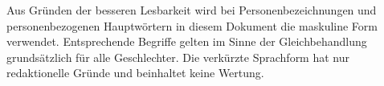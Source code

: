 Aus Gründen der besseren Lesbarkeit wird bei Personenbezeichnungen und personenbezogenen Hauptwörtern in diesem Dokument die maskuline Form verwendet. Entsprechende Begriffe gelten im Sinne der Gleichbehandlung grundsätzlich für alle Geschlechter. Die verkürzte Sprachform hat nur redaktionelle Gründe und beinhaltet keine Wertung.
\newpage
